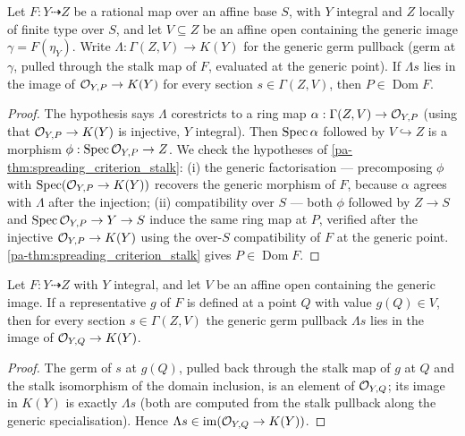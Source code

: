 \begin{theorem}
  \label{pa-thm:germ_range_criterion}
  \leanok

  Let \(F : Y \dashrightarrow Z\) be a rational map over an affine base \(S\),
  with \(Y\) integral and \(Z\) locally of finite type over \(S\), and let
  \(V \subseteq Z\) be an affine open containing the generic image
  \(\gamma = F(\eta_Y)\). Write \(\Lambda : \Gamma(Z, V) \to K(Y)\) for the
  generic germ pullback (germ at \(\gamma\), pulled through the stalk map of
  \(F\), evaluated at the generic point). If \(\Lambda s\) lies in the image of
  \(\mathcal{O}_{Y,P} \to K(Y)\) for every section \(s \in \Gamma(Z, V)\), then
  \(P \in \operatorname{Dom} F\).
\end{theorem}
\begin{proof}
  \leanok
  The hypothesis says \(\Lambda\) corestricts to a ring map
  \(\alpha : \Gamma(Z, V) \to \mathcal{O}_{Y,P}\) (using that \(\mathcal{O}_{Y,P} \to
  K(Y)\) is injective, \(Y\) integral). Then \(\operatorname{Spec}\alpha\) followed by
  \(V \hookrightarrow Z\) is a morphism \(\phi : \operatorname{Spec}\mathcal{O}_{Y,P} \to Z\). We
  check the hypotheses of \ref{pa-thm:spreading_criterion_stalk}: (i) the generic
  factorisation --- precomposing \(\phi\) with \(\operatorname{Spec}(\mathcal{O}_{Y,P} \to K(Y))\)
  recovers the generic morphism of \(F\), because \(\alpha\) agrees with
  \(\Lambda\) after the injection; (ii) compatibility over \(S\) --- both
  \(\phi\) followed by \(Z \to S\) and \(\operatorname{Spec}\mathcal{O}_{Y,P} \to Y \to S\) induce
  the same ring map at \(P\), verified after the injective \(\mathcal{O}_{Y,P} \to
  K(Y)\) using the over-\(S\) compatibility of \(F\) at the generic point.
  \ref{pa-thm:spreading_criterion_stalk} gives \(P \in \operatorname{Dom} F\).
\end{proof}

\begin{theorem}
  \label{pa-thm:germ_range_of_domain}
  \leanok

  Let \(F : Y \dashrightarrow Z\) with \(Y\) integral, and let \(V\) be an affine
  open containing the generic image. If a representative \(g\) of \(F\) is defined
  at a point \(Q\) with value \(g(Q) \in V\), then for every section \(s \in
  \Gamma(Z, V)\) the generic germ pullback \(\Lambda s\) lies in the image of
  \(\mathcal{O}_{Y,Q} \to K(Y)\).
\end{theorem}
\begin{proof}
  \leanok
  The germ of \(s\) at \(g(Q)\), pulled back through the stalk map of \(g\) at
  \(Q\) and the stalk isomorphism of the domain inclusion, is an element of
  \(\mathcal{O}_{Y,Q}\); its image in \(K(Y)\) is exactly \(\Lambda s\) (both are
  computed from the stalk pullback along the generic specialisation). Hence
  \(\Lambda s \in \operatorname{im}(\mathcal{O}_{Y,Q} \to K(Y))\).
\end{proof}

